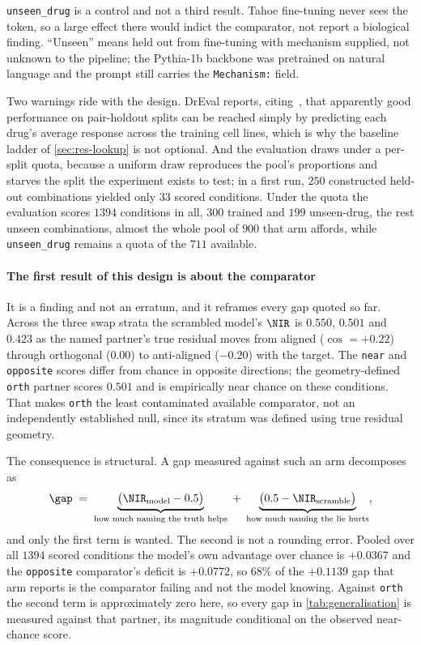 \texttt{unseen\_drug} is a control and not a third result. Tahoe fine-tuning
never sees the token, so a large effect there would indict the comparator, not
report a biological finding. ``Unseen'' means held out from fine-tuning with
mechanism supplied, not unknown to the pipeline; the Pythia-1b backbone was
pretrained on natural language and the prompt still carries the
\texttt{Mechanism:} field.

Two warnings ride with the design. DrEval reports, citing~\cite{partin}, that
apparently good performance on pair-holdout splits can be reached simply by
predicting each drug's average response across the training cell lines, which is
why the baseline ladder of \cref{sec:res-lookup} is not optional. And the
evaluation draws under a per-split quota, because a uniform draw reproduces the
pool's proportions and starves the split the experiment exists to test; in a
first run,
$\num{250}$ constructed held-out combinations yielded only $\num{33}$ scored
conditions. Under the quota the evaluation scores $\num{1394}$ conditions in all,
$\num{300}$ trained and $\num{199}$ unseen-drug, the rest unseen combinations,
almost the whole pool of $\num{900}$ that arm affords, while
\texttt{unseen\_drug} remains a quota of the $\num{711}$ available.

\paragraph{The first result of this design is about the comparator} It is a
finding and not an erratum, and it reframes every gap quoted so far. Across the
three swap strata the scrambled model's $\NIR$ is $0.550$, $0.501$ and $0.423$ as
the named partner's true residual moves from aligned ($\cos = +0.22$) through
orthogonal ($0.00$) to anti-aligned ($-0.20$) with the target. The
\texttt{near} and \texttt{opposite} scores differ from chance in opposite
directions; the geometry-defined \texttt{orth} partner scores $0.501$ and is
empirically near chance on these conditions. That makes \texttt{orth} the least
contaminated available comparator, not an independently established null, since
its stratum was defined using true residual geometry.

The consequence is structural. A gap measured against such an arm decomposes as
\begin{equation}
 \gap \;=\; \underbrace{\big(\NIR_{\textrm{model}} - 0.5\big)}_{\textrm{how much naming the truth helps}}
 \;+\; \underbrace{\big(0.5 - \NIR_{\textrm{scramble}}\big)}_{\textrm{how much naming the lie hurts}},
\end{equation}
and only the first term is wanted. The second is not a rounding error. Pooled
over all $\num{1394}$ scored conditions the model's own advantage over chance is
$+0.0367$ and the \texttt{opposite} comparator's deficit is $+0.0772$, so $68\%$
of the $+0.1139$ gap that arm reports is the comparator failing and not the model
knowing. Against \texttt{orth} the second term is approximately zero here, so
every gap in \cref{tab:generalisation} is measured against that partner, its
magnitude conditional on the observed near-chance score.

